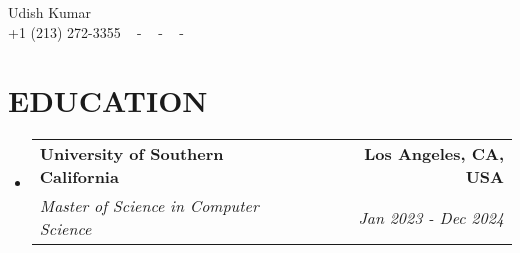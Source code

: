 \documentclass[letterpaper,11pt]{article}
\makeatletter
\newcommand{\resumeSubheading}[4]{
  \vspace{-2pt}\item
    \begin{tabular*}{1.0\textwidth}[t]{l@{\extracolsep{\fill}}r}
      \textbf{\large#1} & \textbf{\small #2} \\
      \textit{\large#3} & \textit{\small #4} \\
      
    \end{tabular*}\vspace{-7pt}
}
\newcommand{\resumeSubHeadingListStart}{\begin{itemize}[leftmargin=0.0in, label={}]}
\newcommand{\resumeSubHeadingListEnd}{\end{itemize}}
\makeatother
\begin{document}

\begin{center}
    {\huge Udish Kumar} \\ \vspace{2pt} 
    {+1 (213) 272-3355} ~ 
    \small{-}
    \href{mailto:udishkum@usc.edu}{\color{blue}{udishkum@usc.edu}} ~ 
    \small{-}
    \href{https://linkedin.com/in/iudishkumar}{\color{blue}{linkedin.com/in/iudishkumar}}  ~
    \small{-}
    \href{https://github.com/udishkumar}{\color{blue}{github.com/udishkumar}} ~
    \vspace{-1pt}
\end{center}

\section{\color{airforceblue}EDUCATION}
  \resumeSubHeadingListStart
    \resumeSubheading
      {University of Southern California}{Los Angeles, CA, USA}
      {Master of Science in Computer Science}{Jan 2023 - Dec 2024}
    \vspace{-4pt}
  \resumeSubHeadingListEnd
  \vspace{-10pt}

\end{document}
